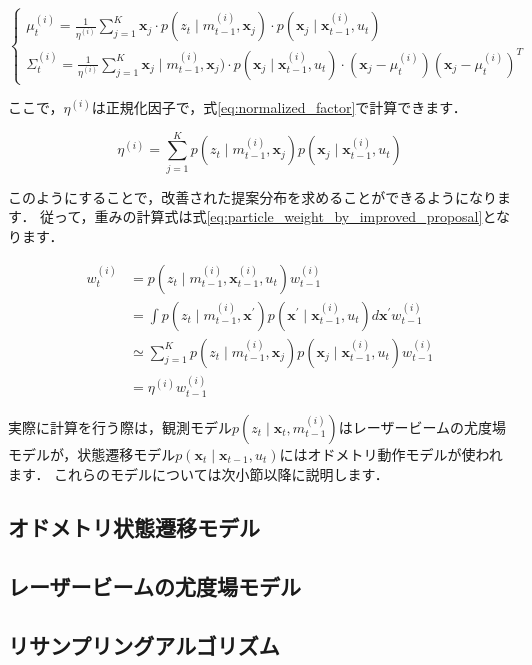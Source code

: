 \documentclass[{../../master}]{subfiles}
\begin{document}
\begin{equation}
  \begin{cases}
    \mu_{t}^{(i)} = \frac{1}{\eta^{(i)}} \sum_{j = 1}^{K} \bm{x}_{j} \cdot p(z_{t} \mid m_{t-1}^{(i)}, \bm{x}_{j}) \cdot p(\bm{x}_{j} \mid \bm{x}_{t-1}^{(i)}, u_{t}) \\
    \Sigma_{t}^{(i)} = \frac{1}{\eta^{(i)}} \sum_{j = 1}^{K}\bm{x}_{j} \mid m_{t-1}^{(i)}, \bm{x}_{j}) \cdot p(\bm{x}_{j} \mid \bm{x}_{t-1}^{(i)}, u_{t}) \cdot (\bm{x}_{j} - \mu_{t}^{(i)})(\bm{x}_{j} - \mu_{t}^{(i)})^{T}
  \end{cases}
  \label{eq:mean_and_covariance}
\end{equation}

\noindent
ここで，$\eta^{(i)}$は正規化因子で，式\ref{eq:normalized_factor}で計算できます．

\begin{equation}
  \eta^{(i)} = \sum_{j=1}^{K} p(z_{t} \mid m_{t-1}^{(i)}, \bm{x}_{j}) p(\bm{x}_{j} \mid \bm{x}_{t-1}^{(i)}, u_{t})
  \label{eq:normalized_factor}
\end{equation}

このようにすることで，改善された提案分布を求めることができるようになります．
従って，重みの計算式は式\ref{eq:particle_weight_by_improved_proposal}となります．

\begin{equation}
  \begin{split}
    w_{t}^{(i)} &= p(z_{t} \mid m_{t-1}^{(i)}, \bm{x}_{t-1}^{(i)}, u_{t}) w_{t-1}^{(i)} \\
    &= \int p(z_{t} \mid m_{t-1}^{(i)}, \bm{x}^{\prime})p(\bm{x}^{\prime} \mid \bm{x}_{t-1}^{(i)}, u_{t})d\bm{x}^{\prime} w_{t-1}^{(i)}\\
    &\simeq \sum_{j=1}^{K} p(z_{t} \mid m_{t-1}^{(i)}, \bm{x}_{j}) p(\bm{x}_{j} \mid \bm{x}_{t-1}^{(i)}, u_{t}) w_{t-1}^{(i)} \\
    &= \eta^{(i)} w_{t-1}^{(i)}
  \end{split}
  \label{eq:particle_weight_by_improved_proposal}
\end{equation}

実際に計算を行う際は，観測モデル$p(z_{t} \mid \bm{x}_{t}, m_{t-1}^{(i)})$はレーザービームの尤度場モデルが，状態遷移モデル$p(\bm{x}_{t} \mid \bm{x}_{t-1}, u_{t})$にはオドメトリ動作モデルが使われます．
これらのモデルについては次小節以降に説明します．

\subsection{オドメトリ状態遷移モデル}

\subsection{レーザービームの尤度場モデル}

\subsection{リサンプリングアルゴリズム}
\end{document}
